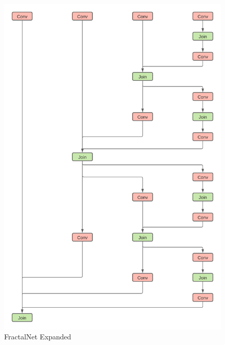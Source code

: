 \begin{appendices}
\begin{figure}[H]
\begin{center}
    \includegraphics[scale=0.7]{Images/fractalNetSingleBlocksUnscaled (1)}
    \caption{FractalNet Expanded}
    \label{fig:fractal_net_expanded}
  \end{center}
\end{figure}
\begin{figure}[H]
  \begin{center}

\end{center}
\end{figure}
\end{appendices}
